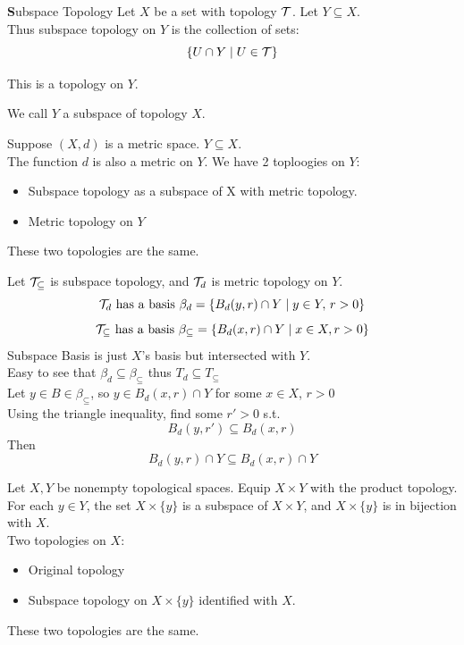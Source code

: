 \begin{example}{ \textbf Subspace Topology}{}
    Let $X$ be a set with topology $\mathcal{T}$. Let $Y \subseteq X$.\\
    Thus subspace topology on $Y$ is the collection of sets:
    \[\{U \cap Y \mid U \in \mathcal{T}\}\]
    
\end{example}
\begin{proposition}
    This is a topology on $Y$.
\end{proposition}
We call $Y$ a subspace of topology $X$.
\begin{example*}{}{}
    Suppose $(X,d)$ is a metric space. $Y \subseteq X$.\\
    The function $d$ is also a metric on $Y$. We have 2 toploogies on $Y$:
    \begin{itemize}
        \item Subspace topology as a subspace of X with metric topology.
        \item Metric topology on $Y$
    \end{itemize}
\end{example*}
\begin{proposition}{}{}
    These two topologies are the same.
\end{proposition}
\begin{proppf}
    Let $\mathcal{T}_\subseteq$ is subspace topology, and $\mathcal{T}_d$ is metric topology on $Y$.\\
    \[\mathcal{T}_d \text{ has a basis } \beta_d=\{B_d(y,r) \cap Y \mid y \in Y, \, r>0\}\]
    \[\mathcal{T}_\subseteq \text{ has a basis } \beta_\subseteq=\{B_d(x,r)\cap Y \mid x\in X, r>0\}\]
    Subspace Basis is just $X$'s basis but intersected with $Y$.\\
    Easy to see that $\beta_d \subseteq \beta_\subseteq$ thus $T_d \subseteq T_\subseteq$\\
    Let $y \in B \in \beta_\subseteq$, so $y \in B_d(x,r) \cap Y$ for some $x \in X$, $r>0$\\
    Using the triangle inequality, find some $r'>0$ s.t.
    \[B_d(y,r') \subseteq B_d(x,r)\]
    Then
    \[B_d(y,r)\cap Y \subseteq B_d(x,r)\cap Y\]
\end{proppf}

\begin{example*}{}
    Let $X,Y$ be nonempty topological spaces. Equip $X \times Y$ with the product topology.
    For each $y\in Y$, the set $X \times \{y\}$ is a subspace of $X \times Y$, and $X \times \{y\}$ is in bijection with $X$.\\
    Two topologies on $X$:
    \begin{itemize}
        \item Original topology
        \item Subspace topology on $X \times \{y\}$ identified with $X$.
    \end{itemize}
\end{example*}
\begin{proposition}{}{}
    These two topologies are the same.
\end{proposition}


